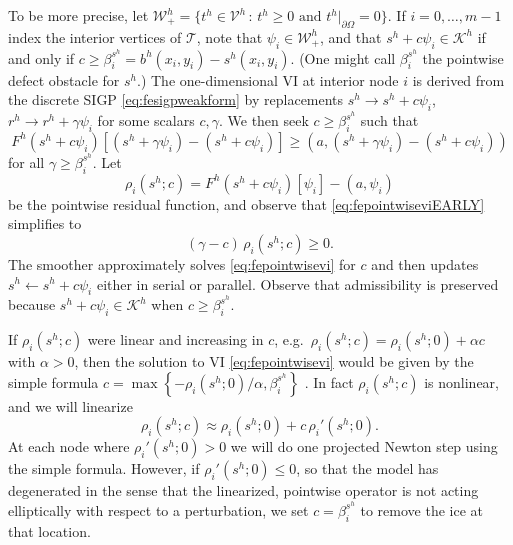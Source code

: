 \documentclass[letterpaper,final,12pt,reqno]{amsart}
\theoremstyle{claim}
\newcommand{\ip}[2]{\left(#1,#2\right)}
\numberwithin{equation}{section}
\numberwithin{figure}{section}
\numberwithin{table}{section}
\numberwithin{theorem}{section}
\begin{document}
To be more precise, let $\mathcal{W}_+^h = \{t^h \in \mathcal{V}^h \,:\, t^h \ge 0 \text{ and } t^h|_{\partial\Omega} = 0\}$.  If $i=0,\dots,m-1$ index the interior vertices of $\mathcal{T}$, note that $\psi_i \in \mathcal{W}_+^h$, and that $s^h + c \psi_i \in \mathcal{K}^h$ if and only if $c\ge \beta_i^{s^h} = b^h(x_i,y_i) - s^h(x_i,y_i)$.  (One might call $\beta_i^{s^h}$ the pointwise defect obstacle \cite{GraeserKornhuber2009} for $s^h$.)  The one-dimensional VI at interior node $i$ is derived from the discrete SIGP \eqref{eq:fesigpweakform} by replacements $s^h \to s^h+c \psi_i$, $r^h \to r^h + \gamma \psi_i$ for some scalars $c,\gamma$.  We then seek $c \ge \beta_i^{s^h}$ such that
\begin{equation}
F^h(s^h+c \psi_i)[(s^h+\gamma \psi_i) - (s^h+c \psi_i)] \ge \ip{a}{(s^h+\gamma \psi_i) - (s^h+c \psi_i)} \label{eq:fepointwiseviEARLY}
\end{equation}
for all $\gamma \ge \beta_i^{s^h}$.  Let
\begin{equation}
\rho_i(s^h; c) = F^h(s^h+c\psi_i)[\psi_i] - \ip{a}{\psi_i} \label{eq:ferhoi}
\end{equation}
be the pointwise residual function, and observe that \eqref{eq:fepointwiseviEARLY} simplifies to
\begin{equation}
(\gamma - c) \,\rho_i(s^h; c) \ge 0. \label{eq:fepointwisevi}
\end{equation}
The smoother approximately solves \eqref{eq:fepointwisevi} for $c$ and then updates $s^h \gets s^h + c \psi_i$ either in serial or parallel.  Observe that admissibility is preserved because $s^h+c \psi_i \in \mathcal{K}^h$ when $c \ge \beta_i^{s^h}$.

If $\rho_i(s^h; c)$ were linear and increasing in $c$, e.g.~$\rho_i(s^h; c) = \rho_i(s^h; 0) + \alpha c$ with $\alpha > 0$, then the solution to VI \eqref{eq:fepointwisevi} would be given by the simple formula $c = \max\left\{-\rho_i(s^h; 0)/\alpha, \beta_i^{s^h}\right\}$ \cite{GraeserKornhuber2009}.  In fact $\rho_i(s^h; c)$ is nonlinear, and we will linearize
\begin{equation}
\rho_i(s^h; c) \approx \rho_i(s^h; 0) + c\, \rho_i'(s^h; 0). \label{eq:rhoapprox}
\end{equation}
At each node where $\rho_i'(s^h; 0) > 0$ we will do one projected Newton step using the simple formula.  However, if $\rho_i'(s^h; 0) \le 0$, so that the model has degenerated in the sense that the linearized, pointwise operator is not acting elliptically with respect to a perturbation, we set $c = \beta_i^{s^h}$ to remove the ice at that location.  %
\end{document}
